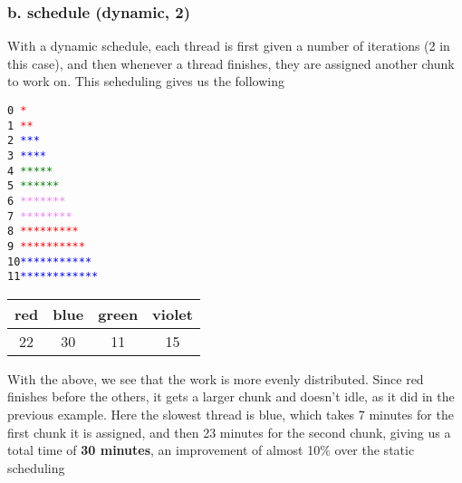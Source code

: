 \documentclass[titlepage]{article}
\def\code#1{\texttt{#1}}
\begin{document}
\subsubsection*{b. schedule (dynamic, 2)}
With a dynamic schedule, each thread is first given a number of iterations
(2 in this case), and then whenever a thread finishes, they are assigned another
chunk to work on. This seheduling gives us the following\\
\begin{minipage}{\linewidth}
\code{0 \textcolor{red}   {*}\\
1 \textcolor{red}   {**}\\
2 \textcolor{blue}  {***}\\
3 \textcolor{blue}  {****}\\
4 \textcolor{green} {*****}\\
5 \textcolor{green} {******}\\
6 \textcolor{violet}{*******}\\
7 \textcolor{violet}{********}\\
8 \textcolor{red}   {*********}\\
9 \textcolor{red}   {**********}\\
10\textcolor{blue}  {***********}\\
11\textcolor{blue}  {************}
}
\end{minipage}
\begin{center}
    \begin{tabular}{|c|c|c|c|}
        \hline
        red&blue&green&violet \\
        \hline
        22 & 30 & 11 & 15 \\
        \hline
    \end{tabular}
\end{center}
With the above, we see that the work is more evenly distributed. Since red
finishes before the others, it gets a larger chunk and doesn't idle, as it
did in the previous example. Here the slowest thread is blue, which takes
7 minutes for the first chunk it is assigned, and then 23 minutes for the
second chunk, giving us a total time of \textbf{30 minutes}, an improvement
of almost 10\% over the static scheduling
\end{document}
